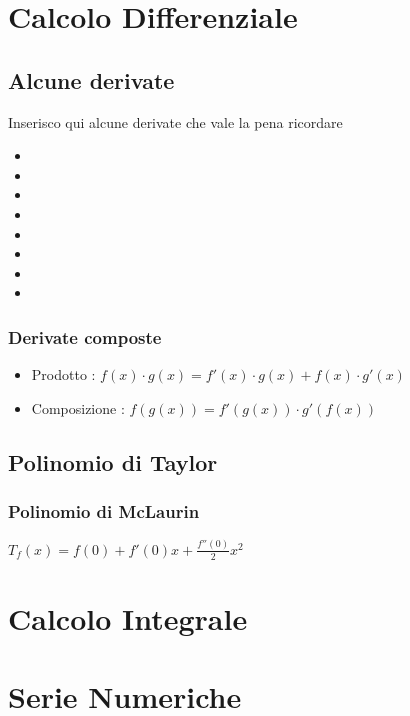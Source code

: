 \documentclass[12pt, a4paper, openany]{book}
\begin{document}
 
\chapter{Calcolo Differenziale}
\section{Alcune derivate}
Inserisco qui alcune derivate che vale la pena ricordare
\begin{itemize}
    \item {}
    \item {}
    \item {}
    \item {}
    \item {}
    \item {}
    \item {}
    \item {}
\end{itemize}
\subsection{Derivate composte}
\begin{itemize}
    \item Prodotto : $f(x) \cdot g(x) = f'(x) \cdot g(x) + f(x) \cdot g'(x)$
    \item Composizione : $f(g(x)) = f'(g(x)) \cdot g'(f(x))$
\end{itemize}
\section{Polinomio di Taylor}

\subsection*{Polinomio di McLaurin}
$T_f(x) = f(0) + f'(0)x + \frac{f''(0)}{2}x^2$

\chapter{Calcolo Integrale}
\chapter{Serie Numeriche}
\end{document}
